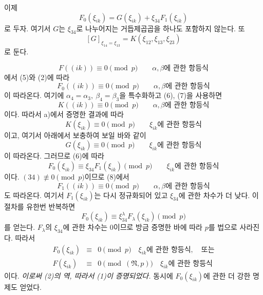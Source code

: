 이제
\begin{equation}
\tag{6}
F_0(\xi_{ik})=G(\xi_{ik})+\xi_{34}F_1(\xi_{ik})
\end{equation}
로 두자. 여기서 \(G\)는 \(\xi_{34}\)로 나누어지는 거듭제곱곱을 하나도 포함하지 않는다. 또
\begin{equation}
\tag{7}
\left[G\right]_{\xi_{14}=\xi_{13}}
=K(\xi_{12},\xi_{13},\xi_{23})
\end{equation}
로 둔다.

\[
F((ik))\equiv0\pmod p
\qquad\text{\(\alpha,\beta\)에 관한 항등식}
\]
에서 (5)와 (2)에 따라
\begin{equation}
\tag{8}
F_0((ik))\equiv0\pmod p
\qquad\text{\(\alpha,\beta\)에 관한 항등식}
\end{equation}
이 따라온다. 여기에 \(\alpha_4=\alpha_3,\ \beta_4=\beta_3\)을 특수화하고 (6), (7)을 사용하면
\[
K((ik))\equiv0\pmod p
\qquad\text{\(\alpha,\beta\)에 관한 항등식}
\]
이다. 따라서 a)에서 증명한 결과에 따라
\[
K(\xi_{ik})\equiv0\pmod p
\qquad\text{\(\xi_{ik}\)에 관한 항등식}
\]
이고, 여기서 아래에서 보충하여 보일 바와 같이
\[
G(\xi_{ik})\equiv0\pmod p
\qquad\text{\(\xi_{ik}\)에 관한 항등식}
\]
이 따라온다. 그러므로 (6)에 따라
\[
F_0(\xi_{ik})\equiv\xi_{34}F_1(\xi_{ik})\pmod p
\qquad\text{\(\xi_{ik}\)에 관한 항등식}
\]
이다. \((34)\not\equiv0\pmod p\)이므로 (8)에서
\[
F_1((ik))\equiv0\pmod p
\qquad\text{\(\alpha,\beta\)에 관한 항등식}
\]
도 따라온다. 여기서 \(F_1(\xi_{ik})\)는 다시 정규화되어 있고 \(\xi_{34}\)에 관한 차수가 더 낮다. 이 절차를 유한번 반복하면
\[
F_0(\xi_{ik})\equiv\xi_{34}^\lambda F_\lambda(\xi_{ik})\pmod p
\]
를 얻는다. \(F_\lambda\)의 \(\xi_{34}\)에 관한 차수는 0이므로 방금 증명한 바에 따라 \(p\)를 법으로 사라진다. 따라서
\begin{equation}
\tag{9}
\begin{array}{rcl}
F_0(\xi_{ik})&\equiv&0\pmod p
\quad\text{\(\xi_{ik}\)에 관한 항등식},\quad\text{또는}\\
F(\xi_{ik})&\equiv&0\pmod{(\mathfrak N,p)}
\quad\text{\(\xi_{ik}\)에 관한 항등식}
\end{array}
\end{equation}
이다. \emph{이로써 (2)의 역, 따라서 (1)이 증명되었다.} 동시에 \(F_0(\xi_{ik})\)에 관한 더 강한 명제도 얻었다.


